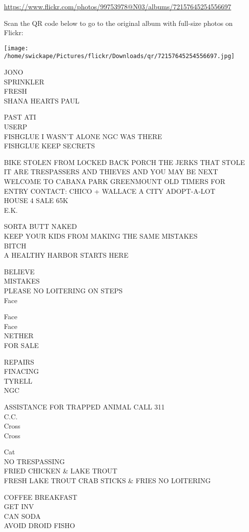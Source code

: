 \documentclass[10pt,letterpaper]{article}
\begin{document}
\url{https://www.flickr.com/photos/99753978@N03/albums/72157645254556697}

Scan the QR code below to go to the original album with full-size photos on Flickr:

\texttt{[image: /home/swickape/Pictures/flickr/Downloads/qr/72157645254556697.jpg]}


JONO\\
SPRINKLER\\
FRESH\\
SHANA HEARTS PAUL

PAST ATI\\
USERP\\
FISHGLUE I WASN'T ALONE NGC WAS THERE\\
FISHGLUE KEEP SECRETS

BIKE STOLEN FROM LOCKED BACK PORCH THE JERKS THAT STOLE IT ARE TRESPASSERS AND THIEVES AND YOU MAY BE NEXT\\
WELCOME TO CABANA PARK GREENMOUNT OLD TIMERS FOR ENTRY CONTACT: CHICO + WALLACE A CITY ADOPT{-}A{-}LOT\\
HOUSE 4 SALE 65K\\
E.K.

SORTA BUTT NAKED\\
KEEP YOUR KIDS FROM MAKING THE SAME MISTAKES\\
BITCH\\
A HEALTHY HARBOR STARTS HERE

BELIEVE\\
MISTAKES\\
PLEASE NO LOITERING ON STEPS\\
Face

Face\\
Face\\
NETHER\\
FOR SALE

REPAIRS\\
FINACING\\
TYRELL\\
NGC

ASSISTANCE FOR TRAPPED ANIMAL CALL 311\\
C.C.\\
Cross\\
Cross

Cat\\
NO TRESPASSING\\
FRIED CHICKEN \& LAKE TROUT\\
FRESH LAKE TROUT CRAB STICKS \& FRIES NO LOITERING

COFFEE BREAKFAST\\
GET INV\\
CAN SODA\\
AVOID DROID FISHO
\end{document}
